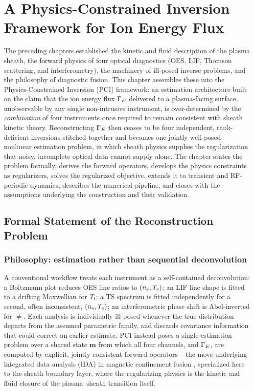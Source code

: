 \chapter{A Physics-Constrained Inversion Framework for Ion Energy Flux}
\label{ch:pci}

The preceding chapters established the kinetic and fluid description of the plasma sheath, the forward physics of four optical diagnostics (OES, LIF, Thomson scattering, and interferometry), the machinery of ill-posed inverse problems, and the philosophy of diagnostic fusion. This chapter assembles these into the Physics-Constrained Inversion (PCI) framework: an estimation architecture built on the claim that the ion energy flux $\Gamma_{E}$ delivered to a plasma-facing surface, unobservable by any single non-intrusive instrument, is over-determined by the \emph{combination} of four instruments once required to remain consistent with sheath kinetic theory. Reconstructing $\Gamma_{E}$ then ceases to be four independent, rank-deficient inversions stitched together and becomes one jointly well-posed nonlinear estimation problem, in which sheath physics supplies the regularization that noisy, incomplete optical data cannot supply alone. The chapter states the problem formally, derives the forward operators, develops the physics constraints as regularizers, solves the regularized objective, extends it to transient and RF-periodic dynamics, describes the numerical pipeline, and closes with the assumptions underlying the construction and their validation.

\section{Formal Statement of the Reconstruction Problem}
\label{sec:pci-formal}

\subsection{Philosophy: estimation rather than sequential deconvolution}

A conventional workflow treats each instrument as a self-contained deconvolution: a Boltzmann plot reduces OES line ratios to $(n_{\mathrm{e}},T_{\mathrm{e}})$; an LIF line shape is fitted to a drifting Maxwellian for $T_{\mathrm{i}}$; a TS spectrum is fitted independently for a second, often inconsistent, $(n_{\mathrm{e}},T_{\mathrm{e}})$; an interferometric phase shift is Abel-inverted for $\ne$. Each analysis is individually ill-posed whenever the true distribution departs from the assumed parametric family, and discards covariance information that could correct an earlier estimate. PCI instead poses a single estimation problem over a shared state $\mathbf{m}$ from which all four channels, and $\Gamma_{E}$, are computed by explicit, jointly consistent forward operators \cite{ref0711,ref0727} -- the move underlying integrated data analysis (IDA) in magnetic confinement fusion \cite{ref0707,ref0712}, specialized here to the sheath boundary layer, where the regularizing physics is the kinetic and fluid closure of the plasma--sheath transition itself.


